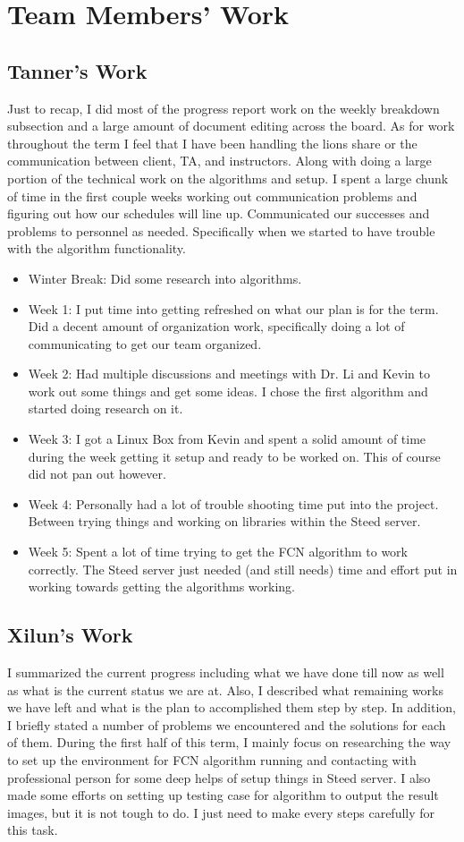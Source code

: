 \documentclass[10pt,draftclsnofoot,onecolumn,journal,compsoc]{IEEEtran}
\begin{document}
\section{Team Members' Work}
\subsection{Tanner's Work}
Just to recap, I did most of the progress report work on the weekly breakdown subsection and a large amount of document editing across the board.
As for work throughout the term I feel that I have been handling the lions share or the communication between client, TA, and instructors. 
Along with doing a large portion of the technical work on the algorithms and setup. 
I spent a large chunk of time in the first couple weeks working out communication problems and figuring out how our schedules will line up. 
Communicated our successes and problems to personnel as needed. 
Specifically when we started to have trouble with the algorithm functionality.
\begin{itemize}
	\item Winter Break: 
	Did some research into algorithms.
	\item Week 1: 
	I put time into getting refreshed on what our plan is for the term. Did a decent amount of organization work, specifically doing a lot of communicating to get our team organized.
	\item Week 2: 
	Had multiple discussions and meetings with Dr. Li and Kevin to work out some things and get some ideas. I chose the first algorithm and started doing research on it.
	\item Week 3:
	I got a Linux Box from Kevin and spent a solid amount of time during the week getting it setup and ready to be worked on. This of course did not pan out however. 
	\item Week 4:
	Personally had a lot of trouble shooting time put into the project. Between trying things and working on libraries within the Steed server.
	\item Week 5: 
	Spent a lot of time trying to get the FCN algorithm to work correctly. The Steed server just needed (and still needs) time and effort put in working towards getting the algorithms working.
\end{itemize}


\subsection{Xilun's Work}
I summarized the current progress including what we have done till now as well as what is the current status we are at. Also, I described what remaining works we have left and what is the plan to accomplished them step by step. 
In addition, I briefly stated a number of problems we encountered and the solutions for each of them.
During the first half of this term, I mainly focus on researching the way to set up the environment for FCN algorithm running and contacting with professional person for some deep helps of setup things in Steed server. 
I also made some efforts on setting up testing case for algorithm to output the result images, but it is not tough to do. 
I just need to make every steps carefully for this task. 
\end{document}
